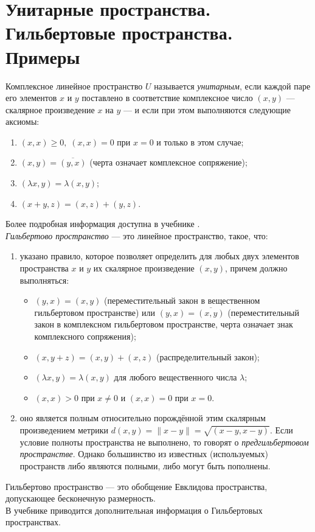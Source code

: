 \section{Унитарные пространства. Гильбертовые пространства. Примеры}
\label{sec:q-22}
Комплексное линейное пространство $U$ называется \textit{унитарным}, если каждой паре его элементов $x$ и $y$ поставлено в соответствие комплексное число $(x, y)$ --- скалярное произведение $x$ на $y$ --- и если при этом выполняются следующие аксиомы:
\begin{enumerate}
	\itemsep0em
	\item $(x, x) \geqslant 0,\; (x, x) = 0$ при $x = 0$ и только в этом случае;
	\item $(x, y) = \overline{(y, x)}$ (черта означает комплексное сопряжение);
	\item $(\lambda x, y) = \lambda(x, y)$;
	\item $(x + y, z) = (x , z) + (y, z)$.
\end{enumerate}
Более подробная информация доступна в учебнике \cite[с.~37]{trenogin}.\\

\textit{Гильбертово пространство} --- это линейное пространство, такое, что:
\begin{enumerate}
	\itemsep0pt
	\item указано правило, которое позволяет определить для любых двух элементов пространства $x$ и $y$ их скалярное произведение $(x,y)$, причем должно выполняться:
	\begin{itemize}
		\item $(y, x) = (x, y)$ (переместительный закон в вещественном гильбертовом пространстве) или $(y, x) = \overline{(x, y)}$ (переместительный закон в комплексном гильбертовом пространстве, черта означает знак комплексного сопряжения);
		\item $(x, y + z) = (x, y) + (x, z)$ (распределительный закон);
		\item $(\lambda x, y) = \lambda (x, y)$ для любого вещественного числа $\lambda$;
		\item $(x, x) > 0$ при $x \ne 0$ и $(x, x)=0$ при $x=0$.
	\end{itemize}
	\item оно является полным относительно порождённой этим скалярным произведением метрики $d(x,y)=\|x-y\|=\sqrt{(x-y,x-y)}$. Если условие полноты пространства не выполнено, то говорят о \textit{предгильбертовом пространстве}. Однако большинство из известных (используемых) пространств либо являются полными, либо могут быть пополнены.
\end{enumerate}
Гильбертово пространство --- это обобщение Евклидова пространства, допускающее бесконечную размерность.\\
В учебнике приводится дополнительная информация о Гильбертовых пространствах\cite[с.~50]{trenogin}.

